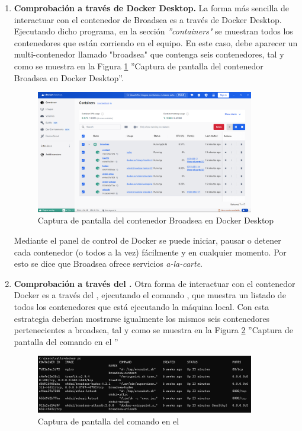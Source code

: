 \begin{enumerate}[label=\alph*]

    \item \textbf{Comprobación a través de Docker Desktop.} La forma más sencilla de interactuar con el contenedor de Broadsea es a través de Docker Desktop. Ejecutando dicho programa, en la sección \textit{''containers"} se muestran todos los contenedores que están corriendo en el equipo. En este caso, debe aparecer un multi-contenedor llamado "broadsea" que contenga seis contenedores, tal y como se muestra en la Figura \ref{fig:dockerDesktop} ''Captura de pantalla del contenedor Broadsea en Docker Desktop''.
    
\begin{figure}[H]
    \centering
    \includegraphics[width=0.90\textwidth]{figures/dockerDesktop.png}
    \caption{Captura de pantalla del contenedor Broadsea en Docker Desktop}
    \label{fig:dockerDesktop}
\end{figure}

    Mediante el panel de control de Docker se puede iniciar, pausar o detener cada contenedor (o todos a la vez) fácilmente y en cualquier momento. Por esto se dice que Broadsea ofrece servicios \textit{a-la-carte}.

    \item \textbf{Comprobación a través del .} Otra forma de interactuar con el contenedor Docker es a través del , ejecutando el comando , que muestra un listado de todos los contenedores que está ejecutando la máquina local. Con esta estrategia deberían mostrarse igualmente los mismos seis contenedores pertenecientes a broadsea, tal y como se muestra en la Figura \ref{fig:dockerCMD} ''Captura de pantalla del comando  en el ''

\begin{figure}[H]
    \centering
    \includegraphics[width=0.90\textwidth]{figures/dockerCMD.png}
    \caption{Captura de pantalla del comando  en el }
    \label{fig:dockerCMD}
\end{figure}
    

\end{enumerate}
